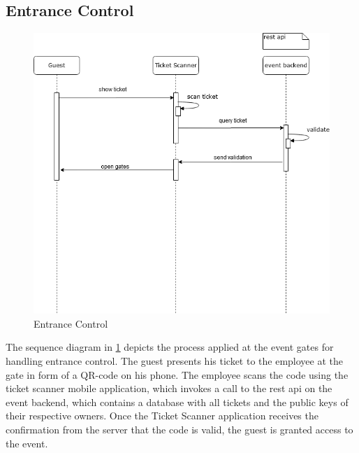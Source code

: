 \subsection{Entrance Control}
\begin{figure}[H]
    \centering
    \includegraphics[width=16cm]{design/diagrams/entrance.png}
    \caption{Entrance Control}
    \label{fig:entranceControl}
\end{figure}

The sequence diagram in \ref{fig:entranceControl} depicts the process applied at the event gates for handling entrance control. The guest presents his ticket to the employee at the gate in form of a QR-code on his phone. The employee scans the code using the ticket scanner mobile application, which invokes a call to the rest api on the event backend, which contains a database with all tickets and the public keys of their respective owners. Once the Ticket Scanner application receives the confirmation from the server that the code is valid, the guest is granted access to the event.





